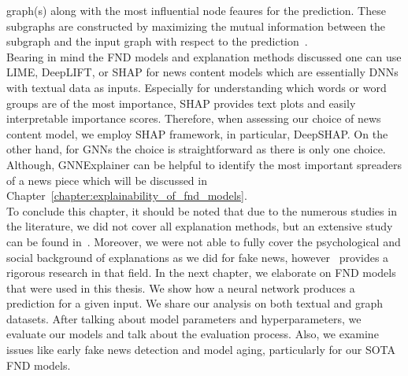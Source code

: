 graph(s) along with the most influential node feaures for the prediction. These subgraphs are constructed by maximizing the mutual information between the subgraph and the input graph with respect to the
prediction~\parencite{GNNExplainer_Ying}.\\
Bearing in mind the FND models and explanation methods discussed one can use LIME, DeepLIFT, or SHAP for news content models which are essentially DNNs with textual data as inputs. Especially for understanding which words or word groups are of the most importance, SHAP provides text plots and easily interpretable importance scores. Therefore, when assessing our choice of news content model, we employ SHAP framework, in particular, DeepSHAP. On the other hand, for GNNs the choice is straightforward as there is only one choice. Although, GNNExplainer can be helpful to identify the most important spreaders of a news piece which will be discussed in Chapter~\ref{chapter:explainability_of_fnd_models}.\\
To conclude this chapter, it should be noted that due to the numerous studies in the literature, we did not cover all explanation methods, but an extensive study can be found in~\parencite{InterpretableMachineLearning_Molnar}. Moreover, we were not able to fully cover the psychological and social background of explanations as we did for fake news, however~\cite{ExplanationInAI_Miller} provides a rigorous research in that field. In the next chapter, we elaborate on FND models that were used in this thesis. We show how a neural network produces a prediction for a given input. We share our analysis on both textual and graph datasets. After talking about model parameters and hyperparameters, we evaluate our models and talk about the evaluation process. Also, we examine issues like early fake news detection and model aging, particularly for our SOTA FND models.
